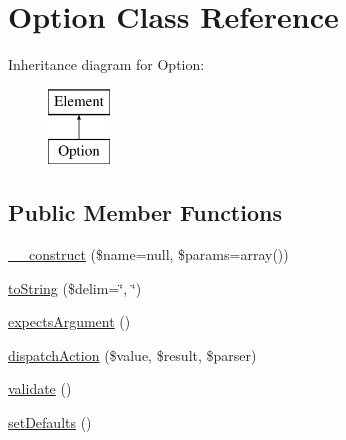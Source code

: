 \hypertarget{class_p_e_a_r2_1_1_console_1_1_command_line_1_1_option}{
\section{\-Option \-Class \-Reference}
\label{class_p_e_a_r2_1_1_console_1_1_command_line_1_1_option}
}
\-Inheritance diagram for \-Option\-:\begin{figure}[H]
\begin{center}
\leavevmode
\includegraphics[height=2.000000cm]{class_p_e_a_r2_1_1_console_1_1_command_line_1_1_option}
\end{center}
\end{figure}
\subsection*{\-Public \-Member \-Functions}
\begin{DoxyCompactItemize}
\item 
\hyperlink{class_p_e_a_r2_1_1_console_1_1_command_line_1_1_option_acce7c1c8eb94525cd672d1610bc1550e}{\-\_\-\-\_\-construct} (\$name=null, \$params=array())
\item 
\hyperlink{class_p_e_a_r2_1_1_console_1_1_command_line_1_1_option_ac6a71376be3fe914f3ff1c0f7a438064}{to\-String} (\$delim=\char`\"{}, \char`\"{})
\item 
\hyperlink{class_p_e_a_r2_1_1_console_1_1_command_line_1_1_option_a87469c37adf9122801880c2f23e36606}{expects\-Argument} ()
\item 
\hyperlink{class_p_e_a_r2_1_1_console_1_1_command_line_1_1_option_a0ecfad7330b11211d958ca9cb985b33f}{dispatch\-Action} (\$value, \$result, \$parser)
\item 
\hyperlink{class_p_e_a_r2_1_1_console_1_1_command_line_1_1_option_a184909dab34698899937d810a9f5d393}{validate} ()
\item 
\hyperlink{class_p_e_a_r2_1_1_console_1_1_command_line_1_1_option_ac900283b8780520c328c6457e34177f4}{set\-Defaults} ()
\end{DoxyCompactItemize}
